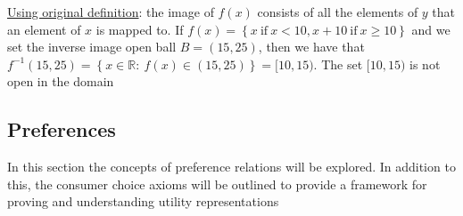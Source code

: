 \documentclass{article}
\begin{document}
  \par
  \underline{Using original definition}: the image of $f(x)$ consists of all the elements of $y$ that an element of $x$ is mapped to. If $f(x) = \left\{x \ \text{if} \ x < 10, x + 10 \ \text{if} \ x \geq 10 \right\}$ and we set the inverse image open ball $B = (15, 25)$, then  we have that $f^{-1}(15,25) = \left\{ x \in \mathbb{R}: \ f(x) \in (15, 25) \right\} = [10, 15)$. \begingroup\color{magenta} The set $[10, 15)$ is not open in the domain \endgroup
  \par

\newpage

\vspace{2.5mm}
\subsection{Preferences}
In this section the concepts of preference relations will be explored. In addition to this, the consumer choice axioms will be outlined to provide a framework for proving and understanding utility representations \par
\vspace{6mm}
\end{document}
